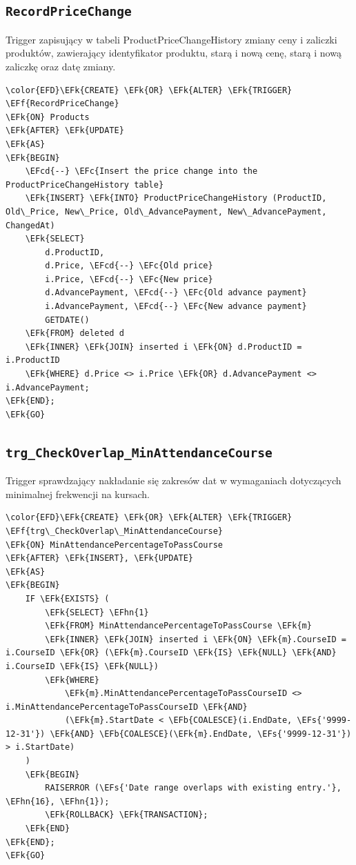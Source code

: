\documentclass[11pt]{article}
\newcommand{\EFc}[1]{\textcolor{EFc}{\textit{#1}}} %
\newcommand{\EFcd}[1]{\textcolor{EFcd}{\textit{#1}}} %
\newcommand{\EFs}[1]{\textcolor{EFs}{#1}} %
\newcommand{\EFk}[1]{\textcolor{EFk}{\textbf{#1}}} %
\newcommand{\EFb}[1]{\textcolor{EFb}{\textbf{#1}}} %
\newcommand{\EFf}[1]{\textcolor{EFf}{#1}} %
\newcommand{\EFhn}[1]{\textcolor{EFhn}{#1}} %
\begin{document}
\subsection{\texttt{RecordPriceChange}}
\label{sec:org47007b8}
Trigger zapisujący w tabeli ProductPriceChangeHistory zmiany ceny i zaliczki produktów, zawierający identyfikator produktu, starą i nową cenę, starą i nową zaliczkę oraz datę zmiany.
\begin{Code}
\begin{Verbatim}
\color{EFD}\EFk{CREATE} \EFk{OR} \EFk{ALTER} \EFk{TRIGGER} \EFf{RecordPriceChange}
\EFk{ON} Products
\EFk{AFTER} \EFk{UPDATE}
\EFk{AS}
\EFk{BEGIN}
    \EFcd{--} \EFc{Insert the price change into the ProductPriceChangeHistory table}
    \EFk{INSERT} \EFk{INTO} ProductPriceChangeHistory (ProductID, Old\_Price, New\_Price, Old\_AdvancePayment, New\_AdvancePayment, ChangedAt)
    \EFk{SELECT} 
        d.ProductID,
        d.Price, \EFcd{--} \EFc{Old price}
        i.Price, \EFcd{--} \EFc{New price}
        d.AdvancePayment, \EFcd{--} \EFc{Old advance payment}
        i.AdvancePayment, \EFcd{--} \EFc{New advance payment}
        GETDATE()
    \EFk{FROM} deleted d
    \EFk{INNER} \EFk{JOIN} inserted i \EFk{ON} d.ProductID = i.ProductID
    \EFk{WHERE} d.Price <> i.Price \EFk{OR} d.AdvancePayment <> i.AdvancePayment;
\EFk{END};
\EFk{GO}
\end{Verbatim}
\end{Code}
\subsection{\texttt{trg\_CheckOverlap\_MinAttendanceCourse}}
\label{sec:orgea3fa0f}
Trigger sprawdzający nakładanie się zakresów dat w wymaganiach dotyczących minimalnej frekwencji na kursach.
\begin{Code}
\begin{Verbatim}
\color{EFD}\EFk{CREATE} \EFk{OR} \EFk{ALTER} \EFk{TRIGGER} \EFf{trg\_CheckOverlap\_MinAttendanceCourse}
\EFk{ON} MinAttendancePercentageToPassCourse
\EFk{AFTER} \EFk{INSERT}, \EFk{UPDATE}
\EFk{AS}
\EFk{BEGIN}
    IF \EFk{EXISTS} (
        \EFk{SELECT} \EFhn{1} 
        \EFk{FROM} MinAttendancePercentageToPassCourse \EFk{m}
        \EFk{INNER} \EFk{JOIN} inserted i \EFk{ON} \EFk{m}.CourseID = i.CourseID \EFk{OR} (\EFk{m}.CourseID \EFk{IS} \EFk{NULL} \EFk{AND} i.CourseID \EFk{IS} \EFk{NULL})
        \EFk{WHERE} 
            \EFk{m}.MinAttendancePercentageToPassCourseID <> i.MinAttendancePercentageToPassCourseID \EFk{AND}
            (\EFk{m}.StartDate < \EFb{COALESCE}(i.EndDate, \EFs{'9999-12-31'}) \EFk{AND} \EFb{COALESCE}(\EFk{m}.EndDate, \EFs{'9999-12-31'}) > i.StartDate)
    )
    \EFk{BEGIN}
        RAISERROR (\EFs{'Date range overlaps with existing entry.'}, \EFhn{16}, \EFhn{1});
        \EFk{ROLLBACK} \EFk{TRANSACTION};
    \EFk{END}
\EFk{END};
\EFk{GO}
\end{Verbatim}
\end{Code}
\end{document}
